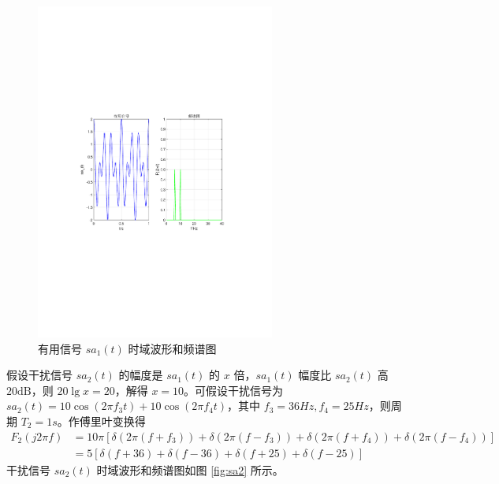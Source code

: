 \documentclass[12pt,AutoFakeBold]{article}
\begin{document}
\begin{figure}[htbp]
	\centering
	\includegraphics[width=0.7\textwidth]{figure/sa1.pdf}
	\caption{有用信号 $sa_1(t)$ 时域波形和频谱图} \label{fig:sa1}
\end{figure}

假设干扰信号 $sa_2(t)$ 的幅度是 $sa_1(t)$ 的 $x$ 倍，$sa_1(t)$ 幅度比 $sa_2(t)$ 高 $20\mathrm{dB}$，则 $20\lg{x}=20$，解得 $x=10$。可假设干扰信号为 $sa_2(t)=10\cos(2\pi f_3t)+10\cos(2\pi f_4t)$，其中 $f_3=36Hz, f_4=25Hz$，则周期 $T_2=1s$。作傅里叶变换得 
%
\begin{align}
F_2(j2\pi f) &= 10\pi\left[\delta(2\pi(f+f_3))+\delta(2\pi(f-f_3))+\delta(2\pi(f+f_4))+\delta(2\pi(f-f_4))\right] \\
 &= 5\left[\delta(f+36)+\delta(f-36)+\delta(f+25)+\delta(f-25)\right]
\end{align}
%
干扰信号 $sa_2(t)$ 时域波形和频谱图如图 \ref{fig:sa2} 所示。
\end{document}
